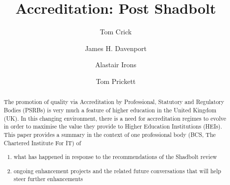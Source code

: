\documentclass[sigconf]{acmart}
\begin{document}
\title{Accreditation: Post Shadbolt}




\author{Tom Crick}


\author{James H. Davenport}

\author{Alastair Irons}

\author{Tom Prickett}


\renewcommand{\shortauthors}{Crick, Davenport,  Irons, and Prickett.}

\begin{abstract}
The promotion of quality via Accreditation by Professional, Statutory and Regulatory Bodies (PSRBs) is very much a feature of higher education in the United Kingdom (UK).  In this changing  environment, there is a need for accreditation regimes to evolve in order to maximise the value they provide to Higher Education Institutions (HEIs).  This paper provides a summary in the context of one professional body (BCS, The Chartered Institute For IT) of 
\begin{enumerate}
\item what has happened in response to the recommendations of the Shadbolt review \cite{shadbolt2016shadbolt}
\item ongoing enhancement projects and the related future conversations that will help steer further enhancements
\end{enumerate}
\end{abstract}
\end{document}
